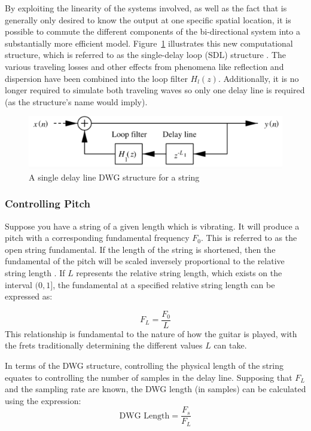 \documentclass[main.tex]{subfiles}
\begin{document}
By exploiting the linearity of the systems involved, as well as the fact that is generally only desired to know the output at one specific spatial location, it is possible to commute the different components of the bi-directional system into a substantially more efficient model. Figure~\ref{fig:SDLModel} illustrates this new computational structure, which is referred to as the single-delay loop (SDL) structure . The various traveling losses and other effects from phenomena like reflection and dispersion have been combined into the loop filter $H_l(z)$. Additionally, it is no longer required to simulate both traveling waves so only one delay line is required (as the structure's name would imply).

\begin{figure}[h]
    \centering
    \includegraphics[scale=1]{./images/diagrams/SDLModel.png}
    \caption{A single delay line DWG structure for a string }
    \label{fig:SDLModel}
\end{figure}

\subsubsection{Controlling Pitch}
Suppose you have a string of a given length which is vibrating. It will produce a pitch with a corresponding fundamental frequency $F_0$. This is referred to as the open string fundamental. If the length of the string is shortened, then the fundamental of the pitch will be scaled inversely proportional to the relative string length . If $L$ represents the relative string length, which exists on the interval $(0, 1]$, the fundamental at a specified relative string length can be expressed as:

\begin{equation}
    F_L = \frac{F_0}{L}
    \label{eq:F_L}
\end{equation}
This relationship is fundamental to the nature of how the guitar is played, with the frets traditionally determining the different values $L$ can take.

In terms of the DWG structure, controlling the physical length of the string equates to controlling the number of samples in the delay line. Supposing that $F_L$ and the sampling rate are known, the DWG length (in samples) can be calculated using the expression:
\begin{equation}
    \text{DWG Length} = \frac{F_s}{F_L}
\end{equation}
\end{document}
